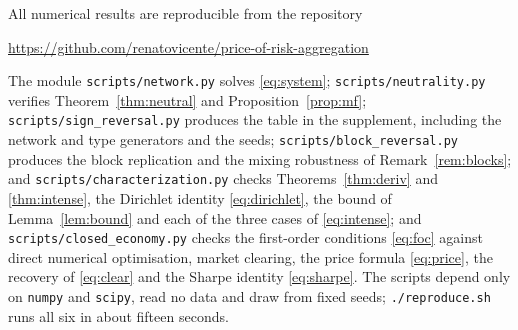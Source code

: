 \documentclass[12pt]{article}
\theoremstyle{definition}
\theoremstyle{remark}
\begin{document}
All numerical results are reproducible from the repository
%
\begin{center}
\url{https://github.com/renatovicente/price-of-risk-aggregation}
\end{center}
%
The module \texttt{scripts/network.py} solves \eqref{eq:system};
\texttt{scripts/neutrality.py} verifies Theorem~\ref{thm:neutral} and
Proposition~\ref{prop:mf}; \texttt{scripts/sign\_reversal.py} produces
the table in the supplement, including the network and type generators and
the seeds; \texttt{scripts/block\_reversal.py} produces the block replication and
the mixing robustness of Remark~\ref{rem:blocks}; and
\texttt{scripts/characterization.py} checks Theorems~\ref{thm:deriv} and
\ref{thm:intense}, the Dirichlet identity \eqref{eq:dirichlet}, the bound of
Lemma~\ref{lem:bound} and each of the three cases of \eqref{eq:intense}; and
\texttt{scripts/closed\_economy.py} checks the first-order conditions
\eqref{eq:foc} against direct numerical optimisation, market clearing, the price
formula \eqref{eq:price}, the recovery of \eqref{eq:clear} and the Sharpe
identity \eqref{eq:sharpe}. The scripts depend only on
\texttt{numpy} and \texttt{scipy}, read no data and draw from fixed seeds;
\texttt{./reproduce.sh} runs all six in about fifteen seconds.
\end{document}
